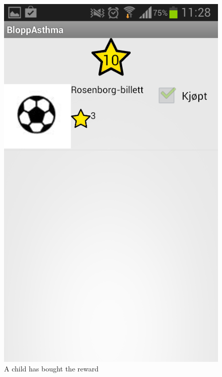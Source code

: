 \begin{figure}
\begin{minipage}[t]{0.25\linewidth}
			\includegraphics[width=0.20\paperwidth]{Pictures/new-screenshots/child-bought-reward.png}
		\caption{A child has bought the reward}
		\label{fig:child-bought-rewards}
	\end{minipage}
\end{figure}

